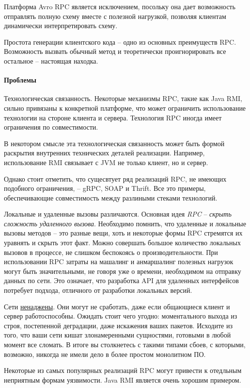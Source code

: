 \documentclass[%
	11pt,
	a4paper,
	utf8,
		]{article}
\begin{document}
Платформа Avro RPC является исключением, посольку она дает возможность отправлять полную схему вместе с полезной нагрузкой, позволяя клиентам динамически интерпретировать схему.

Простота генерации клиентского кода -- одно из основных преимуществ RPC. Возможность вызвать обычный метод и теоретически проигнорировать все остальное -- настоящая находка.

\paragraph{Проблемы} Технологическая связанность. Некоторые механизмы RPC, такие как Java RMI, сильно привязаны к конкретной платформе, что может ограничить использование технологии на стороне клиента и сервера. Технология RPC иногда имеет ограничения по совместимости.

В некотором смысле эта технологическая связанность может быть формой раскрытия внутренних технических деталей реализации. Например, использование RMI связывает с JVM не только клиент, но и сервер.

Однако стоит отметить, что сущесвтует ряд реализаций RPC, не имеющих подобного ограничения, -- gRPC, SOAP и Thrift. Все это примеры, обеспечивающие совместимость между разлиными стеками технологий.

Локальные и удаленные вызовы различаются. Основная идея \emph{RPC} -- \emph{скрыть сложность удаленного вызова}. Необходимо помнить, что удаленные и локальные вызовы методов -- это разные вещи, хоть и некоторые формы RPC стремятся их уравнять и скрыть этот факт. Можно совершать большое количество локальных вызовов в процессе, не слишком беспокоясь о производительности. При использовании RPC затраты на машалинг и анмаршалинг полезных нагрузок могут быть значительными, не говоря уже о времени, необходимом на отправку данных по сети. Это означает, что разработка API для удаленных интерфейсов потребует подхода, отличного от разработки локальных версий.

Сети \underline{ненаджены}. Они могут не сработать, даже если общающиеся клиент и сервер работоспособны. Ожидать стоит чего угодно: моментального выхода из строя, постепенной деградации, даже искажения ваших пакетов. Исходите из того, что ваши сети кишат злонамеренными сущностями, готовыми в любой момент все сломать. В итоге вы столкнетесь с такими типами сбоев, с которыми, возможно, никогда не имели дело в более простом монолитном ПО.

Некоторые из самых популярных реализаций RPC могут привести к отедльным неприятным формам уязвимости. Java RMI является очень хорошим примером.
\end{document}
